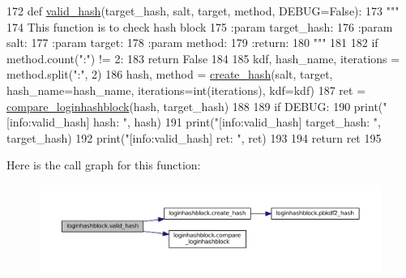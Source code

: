 \begin{DoxyCode}
172 \textcolor{keyword}{def }\hyperlink{namespaceloginhashblock_ac7faa165bc305e611390727f11946424}{valid\_hash}(target\_hash, salt, target, method, DEBUG=False):
173     \textcolor{stringliteral}{"""}
174 \textcolor{stringliteral}{    This function is to check hash block}
175 \textcolor{stringliteral}{    :param target\_hash:}
176 \textcolor{stringliteral}{    :param salt:}
177 \textcolor{stringliteral}{    :param target:}
178 \textcolor{stringliteral}{    :param method:}
179 \textcolor{stringliteral}{    :return:}
180 \textcolor{stringliteral}{    """}
181 
182     \textcolor{keywordflow}{if} method.count(\textcolor{stringliteral}{":"}) != 2:
183         \textcolor{keywordflow}{return} \textcolor{keyword}{False}
184 
185     kdf, hash\_name, iterations = method.split(\textcolor{stringliteral}{":"}, 2)
186     hash, method = \hyperlink{namespaceloginhashblock_a935d8ae1c51e50f9e5db6a1d5f02b1b8}{create\_hash}(salt, target, hash\_name=hash\_name, iterations=int(iterations), 
      kdf=kdf)
187     ret = \hyperlink{namespaceloginhashblock_ac24dd842eb90e0ede55e842d44148d5b}{compare\_loginhashblock}(hash, target\_hash)
188 
189     \textcolor{keywordflow}{if} DEBUG:
190         print(\textcolor{stringliteral}{"[info:valid\_hash]        hash: "}, hash)
191         print(\textcolor{stringliteral}{"[info:valid\_hash] target\_hash: "}, target\_hash)
192         print(\textcolor{stringliteral}{"[info:valid\_hash]         ret: "}, ret)
193 
194     \textcolor{keywordflow}{return} ret
195 
\end{DoxyCode}


Here is the call graph for this function\+:
\nopagebreak
\begin{figure}[H]
\begin{center}
\leavevmode
\includegraphics[width=350pt]{namespaceloginhashblock_ac7faa165bc305e611390727f11946424_cgraph}
\end{center}
\end{figure}


